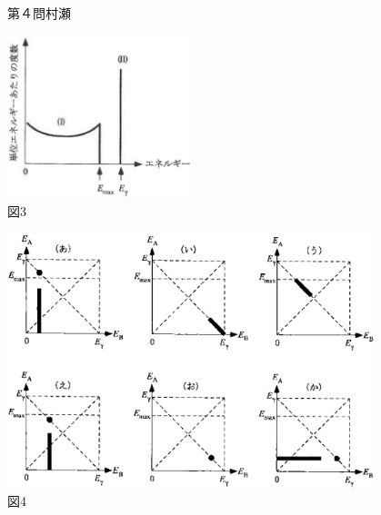\begin{question}{第４問}{村瀬}
\begin{center}
  \includegraphics[width=0.4\textwidth]{2007physQ4_3r.eps}\\図3
\end{center}
\begin{center}
  \includegraphics[width=0.8\textwidth]{2007physQ4_4r.eps}\\図4
\end{center}
\end{question}

